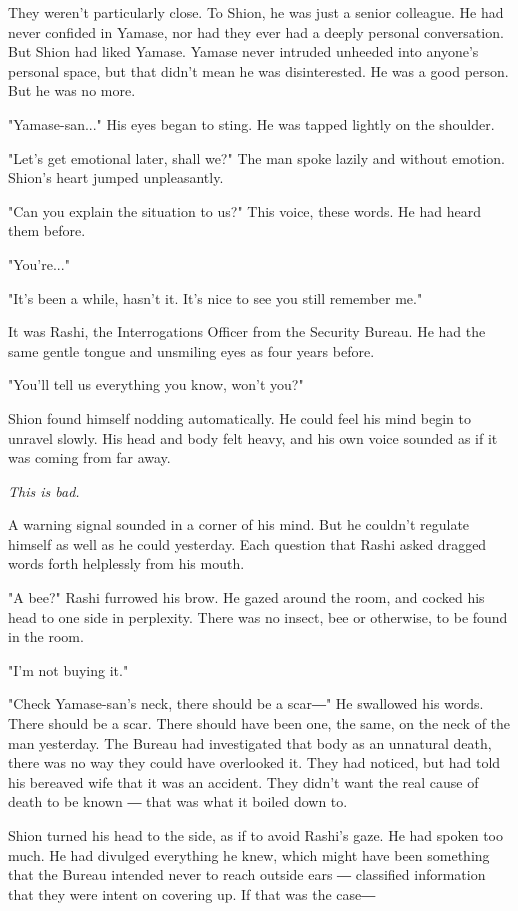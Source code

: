 They weren't particularly close. To Shion, he was just a senior
colleague. He had never confided in Yamase, nor had they ever had a
deeply personal conversation. But Shion had liked Yamase. Yamase never
intruded unheeded into anyone's personal space, but that didn't mean he
was disinterested. He was a good person. But he was no more.

"Yamase-san..." His eyes began to sting. He was tapped lightly on the
shoulder.

"Let's get emotional later, shall we?" The man spoke lazily and without
emotion. Shion's heart jumped unpleasantly.

"Can you explain the situation to us?" This voice, these words. He had
heard them before.

"You're..."

"It's been a while, hasn't it. It's nice to see you still remember me."

It was Rashi, the Interrogations Officer from the Security Bureau. He
had the same gentle tongue and unsmiling eyes as four years before.

"You'll tell us everything you know, won't you?"

Shion found himself nodding automatically. He could feel his mind begin
to unravel slowly. His head and body felt heavy, and his own voice
sounded as if it was coming from far away.

\emph{This is bad.}

A warning signal sounded in a corner of his mind. But he couldn't
regulate himself as well as he could yesterday. Each question that Rashi
asked dragged words forth helplessly from his mouth.

"A bee?" Rashi furrowed his brow. He gazed around the room, and cocked
his head to one side in perplexity. There was no insect, bee or
otherwise, to be found in the room.

"I'm not buying it."

"Check Yamase-san's neck, there should be a scar―" He swallowed his
words. There should be a scar. There should have been one, the same, on
the neck of the man yesterday. The Bureau had investigated that body as
an unnatural death, there was no way they could have overlooked it. They
had noticed, but had told his bereaved wife that it was an accident.
They didn't want the real cause of death to be known ― that was what it
boiled down to.

Shion turned his head to the side, as if to avoid Rashi's gaze. He had
spoken too much. He had divulged everything he knew, which might have
been something that the Bureau intended never to reach outside ears ―
classified information that they were intent on covering up. If that was
the case―

